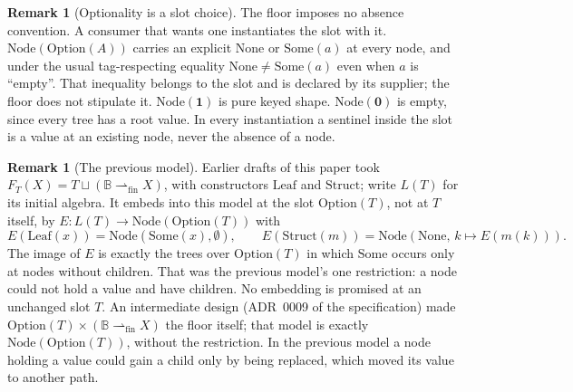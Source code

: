 \documentclass[11pt]{article}
\theoremstyle{definition}
\newtheorem{remark}[theorem]{Remark}
\newcommand{\Bytes}{\mathbb{B}}                    %
\newcommand{\NodeT}[1]{\mathrm{Node}(#1)}
\newcommand{\Leaf}{\mathrm{Leaf}}
\newcommand{\Struct}{\mathrm{Struct}}
\newcommand{\finmap}[2]{#1 \rightharpoonup_{\mathrm{fin}} #2}
\begin{document}
\begin{remark}[Optionality is a slot choice]\label{rem:instances}
The floor imposes no absence convention. A consumer that wants one instantiates the slot
with it. $\NodeT{\mathrm{Option}(A)}$ carries an explicit $\mathrm{None}$ or
$\mathrm{Some}(a)$ at every node, and under the usual tag-respecting equality
$\mathrm{None} \neq \mathrm{Some}(a)$ even when $a$ is ``empty''. That inequality belongs
to the slot and is declared by its supplier; the floor does not stipulate it.
$\NodeT{\mathbf{1}}$ is pure keyed shape. $\NodeT{\mathbf{0}}$ is empty, since every tree
has a root value. In every instantiation a sentinel inside the slot is a value at an
existing node, never the absence of a node.
\end{remark}

\begin{remark}[The previous model]\label{rem:previous}
Earlier drafts of this paper took $F_T(X) = T \sqcup (\finmap{\Bytes}{X})$, with
constructors $\Leaf$ and $\Struct$; write $L(T)$ for its initial algebra. It embeds into
this model at the slot $\mathrm{Option}(T)$, not at $T$ itself, by
$E : L(T) \to \NodeT{\mathrm{Option}(T)}$ with
\[
E(\Leaf(x)) = \mathrm{Node}(\mathrm{Some}(x), \emptyset), \qquad
E(\Struct(m)) = \mathrm{Node}(\mathrm{None},\, k \mapsto E(m(k))).
\]
The image of $E$ is exactly the trees over $\mathrm{Option}(T)$ in which $\mathrm{Some}$
occurs only at nodes without children. That was the previous model's one restriction: a
node could not hold a value and have children. No embedding is promised at an unchanged
slot $T$. An intermediate design (ADR~0009 of the specification) made
$\mathrm{Option}(T) \times (\finmap{\Bytes}{X})$ the floor itself; that model is exactly
$\NodeT{\mathrm{Option}(T)}$, without the restriction. In the previous model a node holding
a value could gain a child only by being replaced, which moved its value to another path.
\end{remark}
\end{document}

